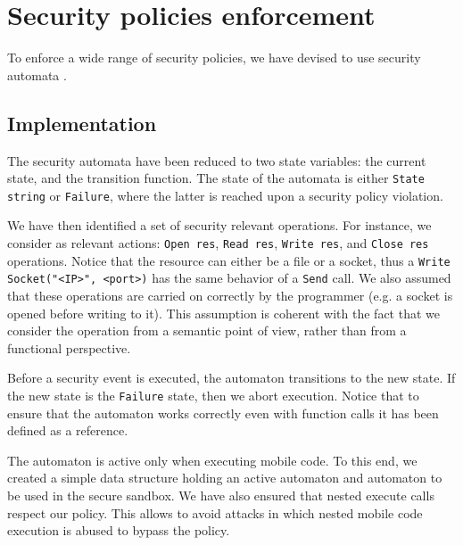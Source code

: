 \section{Security policies enforcement}
To enforce a wide range of security policies, we have devised to use security automata \cite{erlingsson2000sasi,10.1145/353323.353382}.

\subsection{Implementation}
The security automata have been reduced to two state variables: the current state, and the transition function. The state of the automata is either \lstinline{State string} or \lstinline{Failure}, where the latter is reached upon a security policy violation.

We have then identified a set of security relevant operations. For instance, we consider as relevant actions: \lstinline{Open res}, \lstinline{Read res}, \lstinline{Write res}, and \lstinline{Close res} operations. Notice that the resource can either be a file or a socket, thus a \lstinline{Write Socket("<IP>", <port>)} has the same behavior of a \lstinline{Send} call.
We also assumed that these operations are carried on correctly by the programmer (e.g. a socket is opened before writing to it). This assumption is coherent with the fact that we consider the operation from a semantic point of view, rather than from a functional perspective.

Before a security event is executed, the automaton transitions to the new state. If the new state is the \lstinline{Failure} state, then we abort execution. Notice that to ensure that the automaton works correctly even with function calls it has been defined as a reference.

The automaton is active only when executing mobile code. To this end, we created a simple data structure holding an active automaton and automaton to be used in the secure sandbox.
We have also ensured that nested execute calls respect our policy. This allows to avoid attacks in which nested mobile code execution is abused to bypass the policy.